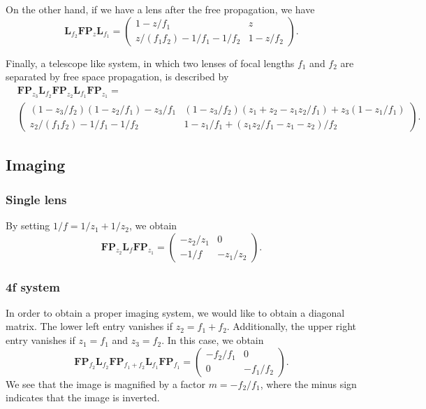 \documentclass[a4paper,10pt]{report}
\begin{document}
On the other hand, if we have a lens after the free propagation, we have
\begin{equation}
    \mathbf{L}_{f_2} \mathbf{FP}_{z} \mathbf{L}_{f_1} = \begin{pmatrix}
        1 - z/f_1 & z \\
        z / (f_1 f_2) - 1/f_1 - 1/f_2 & 1 - z / f_2
    \end{pmatrix} .
\end{equation}

Finally, a telescope like system, in which two lenses of focal lengths $f_1$ and $f_2$ are separated by free space propagation, is described by
\begin{equation}
    \begin{aligned}
        &\mathbf{FP}_{z_3} \mathbf{L}_{f_2} \mathbf{FP}_{z_2} \mathbf{L}_{f_1} \mathbf{FP}_{z_1}  = \\ &\begin{pmatrix}
        (1-z_3/f_2)(1-z_2/f_1) - z_3 / f_1 & (1 - z_3 / f_2)(z_1 + z_2 - z_1 z_2 / f_1) + z_3 (1 - z_1 / f_1) \\
        z_2 / (f_1 f_2) - 1/f_1 - 1/f_2 & 1 - z_1 / f_1 + (z_1 z_2 / f_1 - z_1 - z_2)/f_2
    \end{pmatrix} .
    \end{aligned}
\end{equation}

\subsection{Imaging}

\subsubsection{Single lens}

By setting $1/f = 1/z_1 + 1/z_2$, we obtain
\begin{equation}
    \mathbf{FP}_{z_2} \mathbf{L}_f \mathbf{FP}_{z_1} = \begin{pmatrix}
        -z_2 / z_1 & 0 \\
        -1/f & -z_1 / z_2
    \end{pmatrix} .
\end{equation}

\subsubsection{4f system}

In order to obtain a proper imaging system, we would like to obtain a diagonal matrix. The lower left entry vanishes if $z_2 = f_1 + f_2$. Additionally, the upper right entry vanishes if $z_1 = f_1$ and $z_3 = f_2$. In this case, we obtain 
\begin{equation}
    \mathbf{FP}_{f_2} \mathbf{L}_{f_2} \mathbf{FP}_{f_1+f_2} \mathbf{L}_{f_1} \mathbf{FP}_{f_1} = \begin{pmatrix}
        -f_2 / f_1 & 0 \\
        0 & -f_1 / f_2
    \end{pmatrix} .
\end{equation}
We see that the image is magnified by a factor $m = -f_2 / f_1$, where the minus sign indicates that the image is inverted.
\end{document}
